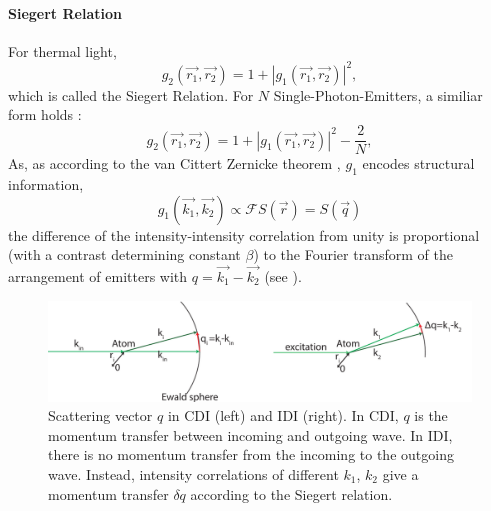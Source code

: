 \paragraph{Siegert Relation}
For thermal light, 
\begin{equation}
	g_2(\vec{r_1},\vec{r_2}) = 1+ |g_1(\vec{r_1},\vec{r_2}) |^2 ,
\end{equation}
which is called the Siegert Relation.
For $N$ Single-Photon-Emitters, a similiar form holds \cite{classen2017}:
\begin{equation}
	g_2(\vec{r_1},\vec{r_2}) = 1+ |g_1(\vec{r_1},\vec{r_2}) |^2 - \frac{2}{N} ,
\end{equation}
As, as according to the van Cittert Zernicke theorem , $g_1$ encodes structural information, 
\begin{equation}
	g_1(\vec{k_1},\vec{k_2}) \propto \mathscr{F}S(\vec{r}) = S(\vec{q})
\end{equation}
the difference of the intensity-intensity correlation from unity is proportional (with a contrast determining constant $\beta$) to the Fourier transform of the arrangement of emitters with $q=\vec{k_1}-\vec{k_2}$ (see ).
\begin{figure}
	\centering
	\includegraphics[width=0.9\linewidth]{images/scatteringvectors.pdf}
	\caption[Scattering Vectors]{Scattering vector $q$ in CDI (left) and IDI (right). In CDI, $q$ is the momentum transfer between incoming and outgoing wave. In IDI, there is no momentum transfer from the incoming to the outgoing wave. Instead, intensity correlations of different $k_1$, $k_2$ give a momentum transfer $\delta q$ according to the Siegert relation.}
	\label{fig:scatteringvectors}
	
\end{figure}

